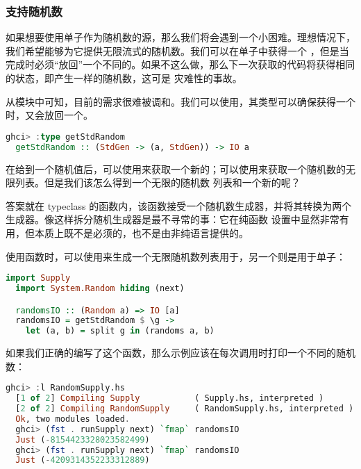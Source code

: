 \documentclass[./main.tex]{subfiles}
\begin{document}
\subsubsection*{支持随机数}

如果想要使用单子作为随机数的源，那么我们将会遇到一个小困难。理想情况下，我们希望能够为它提供无限流式的随机数。我们可以在单子中获得一个
，但是当完成时必须“放回”一个不同的。如果不这么做，那么下一次获取的代码将获得相同的状态，即产生一样的随机数，这可是
灾难性的事故。

从模块中可知，目前的需求很难被调和。我们可以使用，其类型可以确保获得一个时，又会放回一个。

\begin{lstlisting}[language=Haskell]
  ghci> :type getStdRandom
  getStdRandom :: (StdGen -> (a, StdGen)) -> IO a
\end{lstlisting}

在给到一个随机值后，可以使用来获取一个新的；可以使用来获取一个随机数的无限列表。但是我们该怎么得到一个无限的随机数
列表和一个新的呢？

答案就在 typeclass 的函数内，该函数接受一个随机数生成器，并将其转换为两个生成器。像这样拆分随机生成器是最不寻常的事：它在纯函数
设置中显然非常有用，但本质上既不是必须的，也不是由非纯语言提供的。

使用函数时，可以使用来生成一个无限随机数列表用于，另一个则是用于单子：

\begin{lstlisting}[language=Haskell]
  import Supply
  import System.Random hiding (next)

  randomsIO :: (Random a) => IO [a]
  randomsIO = getStdRandom $ \g ->
    let (a, b) = split g in (randoms a, b)
\end{lstlisting}

如果我们正确的编写了这个函数，那么示例应该在每次调用时打印一个不同的随机数：

\begin{lstlisting}[language=Haskell]
  ghci> :l RandomSupply.hs
  [1 of 2] Compiling Supply           ( Supply.hs, interpreted )
  [2 of 2] Compiling RandomSupply     ( RandomSupply.hs, interpreted )
  Ok, two modules loaded.
  ghci> (fst . runSupply next) `fmap` randomsIO
  Just (-8154423328023582499)
  ghci> (fst . runSupply next) `fmap` randomsIO
  Just (-4209314352233312889)
\end{lstlisting}
\end{document}
